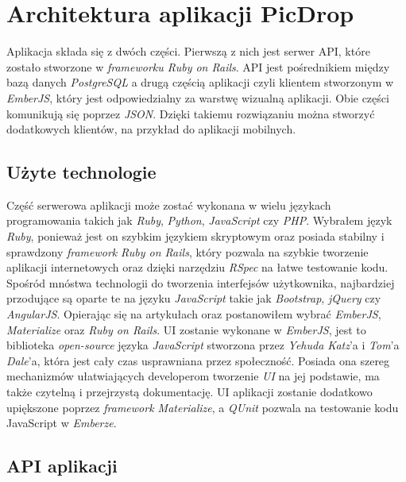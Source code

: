 \documentclass[brudnopis]{xmgr}
\begin{document}
\chapter{Architektura aplikacji PicDrop}
Aplikacja składa się z dwóch części. Pierwszą z nich jest serwer API, które zostało stworzone w \textit{frameworku Ruby on Rails}. API jest pośrednikiem między bazą danych \textit{PostgreSQL} a drugą częścią aplikacji czyli klientem stworzonym w \textit{EmberJS}, który jest odpowiedzialny za warstwę wizualną aplikacji. Obie części komunikują się poprzez \textit{JSON}. Dzięki takiemu rozwiązaniu można stworzyć dodatkowych klientów, na przykład do aplikacji mobilnych.

\section{Użyte technologie}
Część serwerowa aplikacji może zostać wykonana w wielu językach programowania takich jak \textit{Ruby}, \textit{Python}, \textit{JavaScript} czy \textit{PHP}.
Wybrałem język \textit{Ruby}, ponieważ jest on szybkim językiem skryptowym oraz posiada stabilny i sprawdzony \textit{framework} \textit{Ruby on Rails}, który pozwala na szybkie tworzenie aplikacji internetowych oraz dzięki narzędziu \textit{RSpec} na łatwe testowanie kodu.
Spośród mnóstwa technologii do tworzenia interfejsów użytkownika, najbardziej przodujące są oparte te na języku \textit{JavaScript} takie jak \textit{Bootstrap},\textit{ jQuery} czy\\ \textit{AngularJS}. Opierając się na artykułach \cite{} oraz \cite{} postanowiłem wybrać \textit{EmberJS}, \textit{Materialize} oraz \textit{Ruby on Rails}. UI zostanie wykonane w \textit{EmberJS}, jest to  biblioteka  \textit{open-source} języka \textit{JavaScript} stworzona  przez  \textit{Yehuda Katz}'a i \textit{Tom}'a \textit{Dale}'a, która jest cały czas usprawniana przez społeczność. Posiada ona szereg mechanizmów ułatwiających developerom tworzenie \textit{UI} na jej podstawie, ma także czytelną i przejrzystą dokumentację. UI aplikacji zostanie dodatkowo upiększone poprzez \textit{framework Materialize}, a \textit{QUnit} pozwala na testowanie kodu JavaScript w \textit{Emberze}.

\section{API aplikacji}
\end{document}
